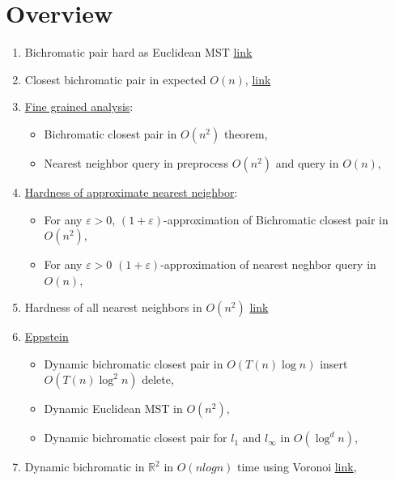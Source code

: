 \documentclass[a4paper,UKenglish,cleveref, autoref, thm-restate]{lipics-v2021}
\begin{document}
\section{Overview}

\begin{enumerate}
    \item Bichromatic pair hard as Euclidean MST \href{https://users.cs.duke.edu/~pankaj/publications/papers/emst.pdf}{link}
    \item Closest bichromatic pair in expected $O(n)$, \href{https://www.cs.umd.edu/~samir/grant/cp.pdf}{link}
    \item \href{https://arxiv.org/pdf/2110.10283.pdf}{Fine grained analysis}:
    \begin{itemize}
        \item Bichromatic closest pair in $O(n^2)$ theorem,
        \item Nearest neighbor query in preprocess $O(n^2)$ and query in $O(n)$,
    \end{itemize}
    \item \href{https://arxiv.org/pdf/1803.00904.pdf}{Hardness of approximate nearest neighbor}:
    \begin{itemize}
        \item For any $\varepsilon > 0$, $(1 + \varepsilon)$-approximation of Bichromatic closest pair in $O(n^2)$,
        \item For any $\varepsilon > 0$ $(1 + \varepsilon)$-approximation of nearest neghbor query in $O(n)$,
    \end{itemize}
    \item Hardness of all nearest neighbors in $O(n^2)$ \href{https://arxiv.org/pdf/1709.05282.pdf}{link}
    
    \item  \href{https://www.ics.uci.edu/~eppstein/pubs/Epp-DCG-95.pdf}{Eppstein}
    \begin{itemize}
        \item Dynamic bichromatic closest pair in $O(T(n)\log n)$ insert $O(T(n) \log^2 n)$ delete,
        \item Dynamic Euclidean MST in $O(n^2)$,
        \item Dynamic bichromatic closest pair for $l_1$ and $l_\infty$ in $O(\log^d n)$,
    \end{itemize}
    
    \item Dynamic bichromatic in $\mathbb R^2$ in $O(n log n)$ time using Voronoi \href{https://borgelt.net/papers/ewcg_07.pdf}{link},
    

\end{enumerate}
\end{document}
